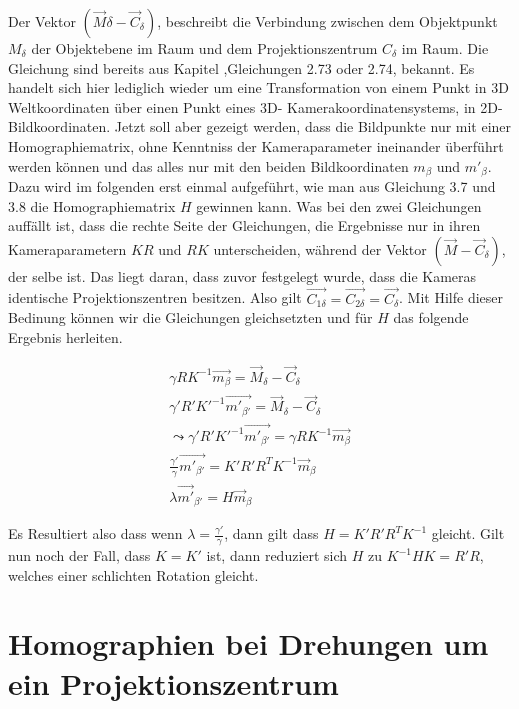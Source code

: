 Der Vektor $(\vec{M}\delta - \vec{C}_\delta)$, beschreibt die Verbindung zwischen dem Objektpunkt $M_\delta$ der Objektebene im Raum und dem Projektionszentrum $C_\delta$ im Raum. Die Gleichung sind bereits aus Kapitel ,Gleichungen 2.73 oder 2.74, bekannt. Es handelt sich hier lediglich wieder um eine Transformation von einem Punkt in 3D Weltkoordinaten über einen Punkt eines 3D- Kamerakoordinatensystems, in 2D-Bildkoordinaten. Jetzt soll aber gezeigt werden, dass die Bildpunkte nur mit einer Homographiematrix, ohne Kenntniss der Kameraparameter ineinander überführt werden können und das alles nur mit den beiden Bildkoordinaten $m_\beta$ und $m'_{\beta}$. Dazu wird im folgenden erst einmal aufgeführt, wie man aus Gleichung 3.7 und 3.8 die Homographiematrix $H$ gewinnen kann. Was bei den zwei Gleichungen auffällt ist, dass die rechte Seite der Gleichungen, die Ergebnisse nur in ihren Kameraparametern $KR$ und $RK$ unterscheiden, während der Vektor $(\vec{M}-\vec{C}_\delta)$, der selbe ist. Das liegt daran, dass zuvor festgelegt wurde, dass die Kameras identische Projektionszentren besitzen. Also gilt $\vec{C_{1\delta}} = \vec{C_{2\delta}} = \vec{C_{\delta}}$. Mit Hilfe dieser Bedinung können wir die Gleichungen gleichsetzten und für $H$ das folgende Ergebnis herleiten. 


\begin{gather}
	\gamma RK^{-1}\vec{m_\beta} = \vec{M}_\delta - \vec{C}_\delta\\
	\gamma' R'K'^{-1}\vec{m'_{\beta'}} = \vec{M}_\delta - \vec{C}_\delta\\
	\leadsto \gamma' R'K'^{-1}\vec{m'_{\beta'}}=\gamma RK^{-1}\vec{m_\beta}\\
	\frac{\gamma'}{\gamma}\vec{m'_{\beta'}} = K'R'R^TK^{-1}\vec{m}_\beta\\
	\lambda \vec{m'}_{\beta'} = H\vec{m}_\beta
\end{gather}

Es Resultiert also dass wenn $\lambda = \frac{\gamma'}{\gamma}$, dann gilt dass $H = K'R'R^TK^{-1}$ gleicht. Gilt nun noch der Fall, dass $K = K'$ ist, dann reduziert sich $H$ zu $K^{-1}HK = R'R$, welches einer schlichten Rotation gleicht.\cite{Elements}




\section{Homographien bei Drehungen um ein Projektionszentrum}

